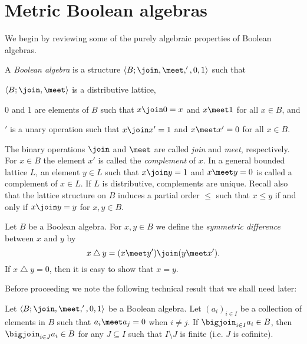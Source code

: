 \documentclass[article, a4paper, 11pt, oneside]{memoir}
\numberwithin{equation}{chapter}
\renewcommand{\symdiff}{\mathbin{\triangle}}
\begin{document}
\chapter{Metric Boolean algebras}

We begin by reviewing some of the purely algebraic properties of Boolean algebras.

\begin{definition}
    \label{def:Boolean-algebra}
    A \emph{Boolean algebra} is a structure $\langle B; \join, \meet, ', 0, 1 \rangle$ such that
    \begin{enumdef}
        \item $\langle B; \join, \meet \rangle$ is a distributive lattice,
        \item $0$ and $1$ are elements of $B$ such that $x \join 0 = x$ and $x \meet 1$ for all $x \in B$, and
        \item $'$ is a unary operation such that $x \join x' = 1$ and $x \meet x' = 0$ for all $x \in B$.
    \end{enumdef}
\end{definition}
%
The binary operations $\join$ and $\meet$ are called \emph{join} and \emph{meet}, respectively. For $x \in B$ the element $x'$ is called the \emph{complement} of $x$. In a general bounded lattice $L$, an element $y \in L$ such that $x \join y = 1$ and $x \meet y = 0$ is called a complement of $x \in L$. If $L$ is distributive, complements are unique. Recall also that the lattice structure on $B$ induces a partial order $\leq$ such that $x \leq y$ if and only if $x \join y = y$ for $x,y \in B$.

Let $B$ be a Boolean algebra. For $x,y \in B$ we define the \emph{symmetric difference} between $x$ and $y$ by
%
\begin{equation*}
    x \symdiff y
        = (x \meet y') \join (y \meet x').
\end{equation*}
%
If $x \symdiff y = 0$, then it is easy to show that $x = y$.

Before proceeding we note the following technical result that we shall need later:

\begin{lemma}
    \label{thm:refine_join}
    Let $\langle B; \join, \meet, ', 0, 1 \rangle$ be a Boolean algebra. Let $(a_i)_{i \in I}$ be a collection of elements in $B$ such that $a_i \meet a_j = 0$ when $i \neq j$. If $\bigjoin_{i \in I} a_i \in B$, then $\bigjoin_{i \in J} a_i \in B$ for any $J \subseteq I$ such that $I \setminus J$ is finite (i.e. $J$ is cofinite).
\end{lemma}
\end{document}

